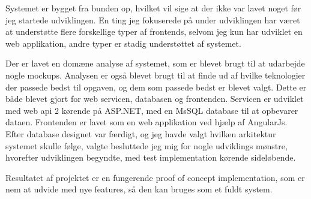 Systemet er bygget fra bunden op, hvilket vil sige at der ikke var lavet noget
før jeg startede udviklingen. En ting jeg fokuserede på under udviklingen har
været at understøtte flere forskellige typer af frontends, selvom jeg kun har
udviklet en web applikation, andre typer er stadig understøttet af systemet.

Der er lavet en domæne analyse af systemet, som er blevet brugt til at udarbejde
nogle mockups. Analysen er også blevet brugt til at finde ud af hvilke
teknologier der passede bedst til opgaven, og dem som passede bedst er blevet
valgt. Dette er både blevet gjort for web servicen, databasen og frontenden.
Servicen er udviklet med web api 2 kørende på ASP.NET, med en MsSQL database
til at opbevarer dataen. Frontenden er lavet som en web applikation ved hjælp
af AngularJs. Efter database designet var færdigt, og jeg havde valgt hvilken
arkitektur systemet skulle følge, valgte besluttede jeg mig for nogle
udviklings mønstre, hvorefter udviklingen begyndte, med test implementation
kørende sideløbende.

Resultatet af projektet er en fungerende proof of concept implementation, som er
nem at udvide med nye features, så den kan bruges som et fuldt system.